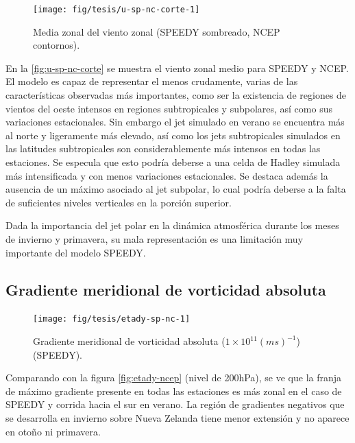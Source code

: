 \documentclass[spanish,a4paper,12pt,oneside]{book}
\begin{document}
\begin{figure}
\texttt{[image: fig/tesis/u-sp-nc-corte-1]} \caption{Media zonal del viento zonal (SPEEDY sombreado, NCEP contornos).}\label{fig:u-sp-nc-corte}
\end{figure}

En la \autoref{fig:u-sp-nc-corte} se muestra el viento zonal medio para
SPEEDY y NCEP. El modelo es capaz de representar el menos crudamente,
varias de las características observadas más importantes, como ser la
existencia de regiones de vientos del oeste intensos en regiones
subtropicales y subpolares, así como sus variaciones estacionales. Sin
embargo el jet simulado en verano se encuentra más al norte y
ligeramente más elevado, así como los jets subtropicales simulados en
las latitudes subtropicales son considerablemente más intensos en todas
las estaciones. Se especula que esto podría deberse a una celda de
Hadley simulada más intensificada y con menos variaciones estacionales.
Se destaca además la ausencia de un máximo asociado al jet subpolar, lo
cual podría deberse a la falta de suficientes niveles verticales en la
porción superior.

Dada la importancia del jet polar en la dinámica atmosférica durante los
meses de invierno y primavera, su mala representación es una limitación
muy importante del modelo SPEEDY.

\subsection{Gradiente meridional de vorticidad
absoluta}\label{gradiente-meridional-de-vorticidad-absoluta}

\begin{landscape}\begin{figure}

{\centering \texttt{[image: fig/tesis/etady-sp-nc-1]} 

}

\caption{Gradiente meridional de vorticidad absoluta ($1\times10^{11}(ms)^{-1}$) (SPEEDY).}\label{fig:etady-sp-nc}
\end{figure}
\end{landscape}

Comparando con la figura \autoref{fig:etady-ncep} (nivel de 200hPa), se
ve que la franja de máximo gradiente presente en todas las estaciones es
más zonal en el caso de SPEEDY y corrida hacia el sur en verano. La
región de gradientes negativos que se desarrolla en invierno sobre Nueva
Zelanda tiene menor extensión y no aparece en otoño ni primavera.
\end{document}
